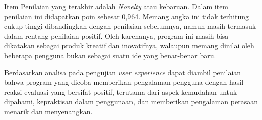 Item Penilaian yang terakhir adalah \emph{Novelty} atau kebaruan. Dalam item penilaian ini didapatkan poin sebesar 0,964. Memang angka ini tidak terhitung cukup tinggi dibandingkan dengan penilaian sebelumnya, namun masih termasuk dalam rentang penilaian positif. Oleh karenanya, program ini masih bisa dikatakan sebagai produk kreatif dan inovatifnya, walaupun memang dinilai oleh beberapa pengguna bukan sebagai suatu ide yang benar-benar baru.

Berdasarkan analisa pada pengujian \emph{user experience} dapat diambil penilaian bahwa program yang dicoba memberikan pengalaman pengguna dengan hasil reaksi evaluasi yang bersifat positif, terutama dari aspek kemudahan untuk dipahami, kepraktisan dalam penggunaan, dan memberikan pengalaman perasaan menarik dan menyenangkan.